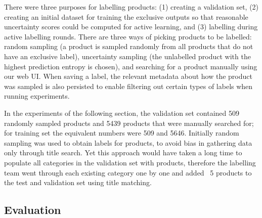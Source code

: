 There were three purposes for labelling products: (1) creating a validation set, (2) creating an initial dataset for training the exclusive outputs so that reasonable uncertainty scores could be computed for active learning, and (3) labelling during active labelling rounds.
There are three ways of picking products to be labelled: random sampling (a product is sampled randomly from all products that do not have an exclusive label), uncertainty sampling (the unlabelled product with the highest prediction entropy is chosen), and searching for a product manually using our web UI.
When saving a label, the relevant metadata about how the product was sampled is also persisted to enable filtering out certain types of labels when running experiments.

In the experiments of the following section, the validation set contained 509 randomly sampled products and 5439 products that were manually searched for; for training set the equivalent numbers were 509 and 5646.
Initially random sampling was used to obtain labels for products, to avoid bias in gathering data only through title search.
Yet this approach would have taken a long time to populate all categories in the validation set with products, therefore the labelling team went through each existing category one by one and added ~5 products to the test and validation set using title matching.


\subsection{Evaluation}


